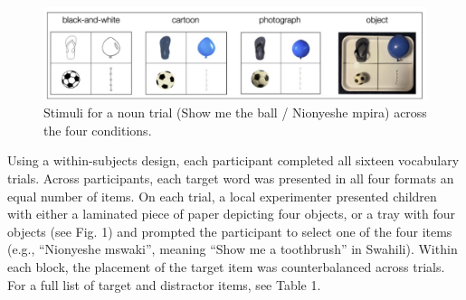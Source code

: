 \documentclass[10pt, letterpaper]{article}
\begin{document}
\begin{CodeChunk}
\begin{figure}[tb]

{\centering \includegraphics[width=6in]{fig1} 

}

\caption[Stimuli for a noun trial (Show me the ball / Nionyeshe mpira) across the four conditions]{Stimuli for a noun trial (Show me the ball / Nionyeshe mpira) across the four conditions.}\label{fig:figure1}
\end{figure}
\end{CodeChunk}

Using a within-subjects design, each participant completed all sixteen
vocabulary trials. Across participants, each target word was presented
in all four formats an equal number of items. On each trial, a local
experimenter presented children with either a laminated piece of paper
depicting four objects, or a tray with four objects (see Fig. 1) and
prompted the participant to select one of the four items (e.g.,
``Nionyeshe mswaki'', meaning ``Show me a toothbrush'' in Swahili).
Within each block, the placement of the target item was counterbalanced
across trials. For a full list of target and distractor items, see Table
1.
\end{document}
